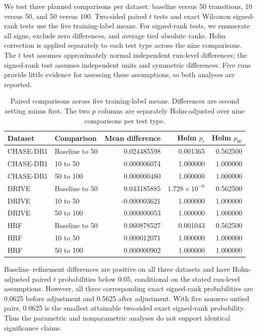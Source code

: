 \documentclass[jimaging,article,submit,pdftex,moreauthors]{Definitions/mdpi}%
\begin{document}
We test three planned comparisons per dataset: baseline versus 50 transitions, 10 versus 50, and 50 versus 100. Two-sided paired $t$ tests and exact Wilcoxon signed-rank tests use the five training-label means. For signed-rank tests, we enumerate all signs, exclude zero differences, and average tied absolute ranks. Holm correction is applied separately to each test type across the nine comparisons. The $t$ test assumes approximately normal independent run-level differences; the signed-rank test assumes independent units and symmetric differences. Five runs provide little evidence for assessing these assumptions, so both analyses are reported.



\begin{table}[htbp]
\centering
\caption{Paired comparisons across five training-label means. Differences are second setting minus first. The two $p$ columns are separately Holm-adjusted over nine comparisons per test type.}
\label{tab:uploaded_training_paired_tests}
\scriptsize
\begin{tabular}{llrrr}
\toprule
Dataset & Comparison & Mean difference & Holm $p_t$ & Holm $p_W$ \\
\midrule
CHASE-DB1 & Baseline to 50 & 0.024485598 & 0.001365 & 0.562500 \\
CHASE-DB1 & 10 to 50 & 0.000006074 & 1.000000 & 1.000000 \\
CHASE-DB1 & 50 to 100 & 0.000000480 & 1.000000 & 1.000000 \\
DRIVE & Baseline to 50 & 0.043185885 & $1.728\times10^{-6}$ & 0.562500 \\
DRIVE & 10 to 50 & -0.000003621 & 1.000000 & 1.000000 \\
DRIVE & 50 to 100 & 0.000000053 & 1.000000 & 1.000000 \\
HRF & Baseline to 50 & 0.060878527 & 0.001043 & 0.562500 \\
HRF & 10 to 50 & 0.000012071 & 1.000000 & 1.000000 \\
HRF & 50 to 100 & 0.000000902 & 1.000000 & 1.000000 \\
\bottomrule
\end{tabular}
\end{table}



Baseline--refinement differences are positive on all three datasets and have Holm-adjusted paired $t$ probabilities below 0.05, conditional on the stated run-level assumptions. However, all three corresponding exact signed-rank probabilities are 0.0625 before adjustment and 0.5625 after adjustment. With five nonzero untied pairs, 0.0625 is the smallest attainable two-sided exact signed-rank probability. Thus the parametric and nonparametric analyses do not support identical significance claims.
\end{document}
